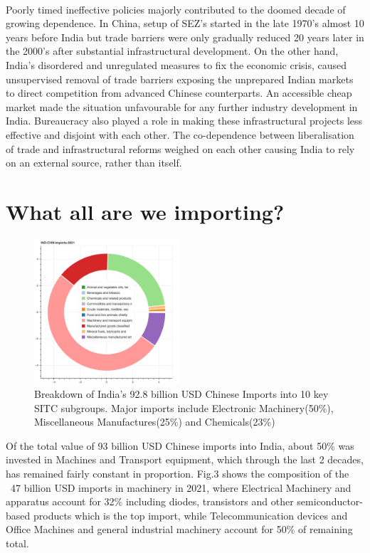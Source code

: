 \documentclass{article}
\begin{document}
\paragraph{}
Poorly timed ineffective policies majorly contributed to the doomed decade of growing dependence. In China, setup of SEZ’s started in the late 1970’s almost 10 years before India but trade barriers were only gradually reduced 20 years later in the 2000’s after substantial infrastructural development.
On the other hand, India's disordered and unregulated measures to fix the economic crisis, caused unsupervised removal of trade barriers exposing the unprepared Indian markets to direct competition from advanced Chinese counterparts. An accessible cheap market made the situation unfavourable for any further industry development in India. 
Bureaucracy also played a role in making these infrastructural projects less effective and disjoint with each other. The co-dependence between liberalisation of trade and infrastructural reforms weighed on each other causing India to rely on an external source, rather than itself.


\section*{What all are we importing?}

\begin{figure}[htp]
    \centering
    \includegraphics[width=0.48\textwidth]{ind_chn_imports_2021.png} %
    \captionsetup{skip=0pt,font=small} %
    \caption{Breakdown of India's 92.8 billion USD Chinese Imports into 10 key SITC subgroups. Major imports include Electronic Machinery(50\%), Miscellaneous Manufactures(25\%) and Chemicals(23\%)}
\end{figure}


Of the total value of 93 billion USD Chinese imports into India, about 50\% was invested in Machines and Transport equipment, which through the last 2 decades, has remained fairly constant in proportion.
Fig.3 shows the composition of the ~47 billion USD imports in machinery in 2021, where Electrical Machinery and apparatus account for 32\% including diodes, transistors and other semiconductor-based products which is the top import, while Telecommunication devices and Office Machines and general industrial machinery account for 50\% of remaining total.
\end{document}

